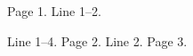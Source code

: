 \documentclass{article}
\begin{document}
    Page 1.
    Line 1--2.

    Line 1--4.
    \newpage
    Page 2.
    Line 2.
    \newpage
    Page 3.
\end{document}
